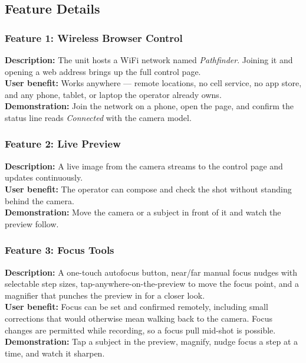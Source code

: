 \documentclass[11pt,a4paper]{article}
\begin{document}
\subsection{Feature Details}

\subsubsection{Feature 1: Wireless Browser Control}
\textbf{Description:} The unit hosts a WiFi network named \textit{Pathfinder}. Joining it and opening a web address brings up the full control page.\\
\textbf{User benefit:} Works anywhere --- remote locations, no cell service, no app store, and any phone, tablet, or laptop the operator already owns.\\
\textbf{Demonstration:} Join the network on a phone, open the page, and confirm the status line reads \textit{Connected} with the camera model.


\subsubsection{Feature 2: Live Preview}
\textbf{Description:} A live image from the camera streams to the control page and updates continuously.\\
\textbf{User benefit:} The operator can compose and check the shot without standing behind the camera.\\
\textbf{Demonstration:} Move the camera or a subject in front of it and watch the preview follow.

\subsubsection{Feature 3: Focus Tools}
\textbf{Description:} A one-touch autofocus button, near/far manual focus nudges with selectable step sizes, tap-anywhere-on-the-preview to move the focus point, and a magnifier that punches the preview in for a closer look.\\
\textbf{User benefit:} Focus can be set and confirmed remotely, including small corrections that would otherwise mean walking back to the camera. Focus changes are permitted while recording, so a focus pull mid-shot is possible.\\
\textbf{Demonstration:} Tap a subject in the preview, magnify, nudge focus a step at a time, and watch it sharpen.
\end{document}
